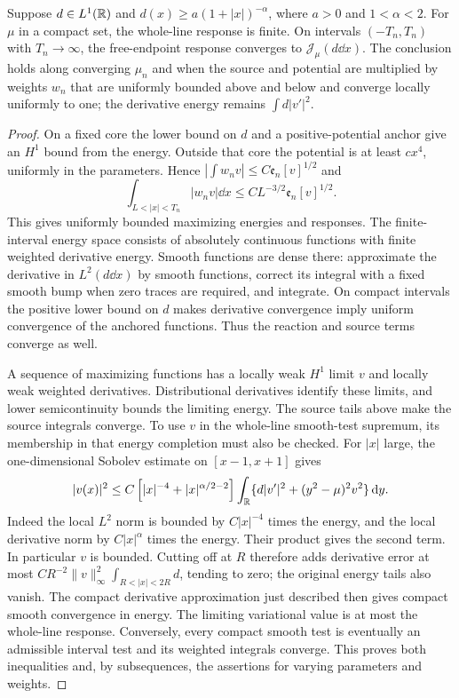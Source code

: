 \begin{lemma}
\label{lem:graded-neumann-limit}
Suppose $d\in L^1(\mathbb R)$ and
$d(x)\ge a(1+|x|)^{-\alpha}$, where $a>0$ and $1<\alpha<2$.
For $\mu$ in a compact set, the whole-line response is finite.
On intervals $(-T_n,T_n)$ with $T_n\to\infty$, the free-endpoint
response converges to $\mathscr J_\mu(d\dd x)$. The conclusion holds
along converging $\mu_n$ and when the source and potential are
multiplied by weights $w_n$ that are uniformly bounded above and
below and converge locally uniformly to one; the derivative energy
remains $\int d|v'|^2$.
\end{lemma}
\begin{proof}
On a fixed core the lower bound on $d$ and a positive-potential
anchor give an $H^1$ bound from the energy. Outside that core the
potential is at least $cx^4$, uniformly in the parameters. Hence
$|\int w_nv|\le C\mathfrak e_n[v]^{1/2}$ and
\[
 \int_{L<|x|<T_n}|w_nv|\dd x
      \le CL^{-3/2}\mathfrak e_n[v]^{1/2}.
\]
This gives uniformly bounded maximizing energies and responses.
The finite-interval energy space consists of absolutely continuous
functions with finite weighted derivative energy. Smooth functions
are dense there: approximate the derivative in $L^2(d\dd x)$ by
smooth functions, correct its integral with a fixed smooth bump
when zero traces are required, and integrate. On compact intervals
the positive lower bound on $d$ makes derivative convergence imply
uniform convergence of the anchored functions. Thus the reaction
and source terms converge as well.

A sequence of maximizing functions has a locally weak $H^1$ limit
$v$ and locally weak weighted derivatives. Distributional derivatives
identify these limits, and lower semicontinuity bounds the limiting
energy. The source tails above make the source integrals converge.
To use $v$ in the whole-line smooth-test supremum, its membership in
that energy completion must also be checked. For $|x|$ large, the
one-dimensional Sobolev estimate on $[x-1,x+1]$ gives
\[
 |v(x)|^2\le C\left[|x|^{-4}+|x|^{\alpha/2-2}\right]
  \int_\mathbb R\{d|v'|^2+(y^2-\mu)^2v^2\}\,\mathrm d y.
\]
Indeed the local $L^2$ norm is bounded by $C|x|^{-4}$ times the
energy, and the local derivative norm by $C|x|^\alpha$ times the
energy. Their product gives the second term. In particular $v$
is bounded. Cutting off at $R$ therefore adds derivative error at
most $CR^{-2}\|v\|_\infty^2\int_{R<|x|<2R}d$, tending to zero;
the original energy tails also vanish. The compact derivative
approximation just described then gives compact smooth convergence
in energy. The limiting variational value is at most the whole-line
response. Conversely, every compact smooth test is eventually an
admissible interval test and its weighted integrals converge.
This proves both inequalities and, by subsequences, the assertions
for varying parameters and weights.
\end{proof}

